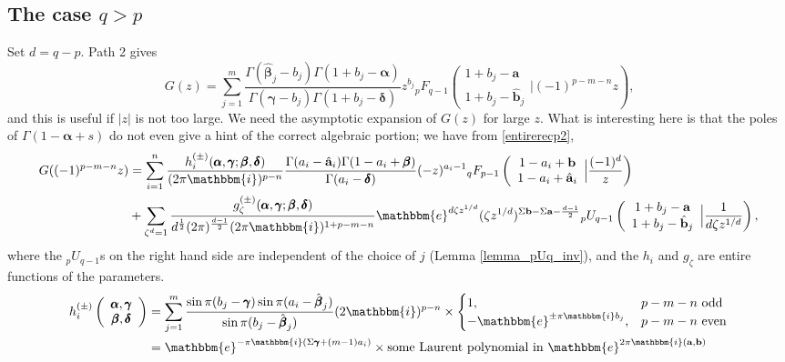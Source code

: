\documentclass[12pt]{article}
\newcommand{\ee}[0] {\mathbbm{e}}
\newcommand{\ii}[0] {\mathbbm{i}}
\numberwithin{equation}{section}
\newcommand{\FF}[6] {{}_{#1}{#2}_{#3} \left( \begin{array}{c} #4 \\ #5 \end{array} \Big| {#6}  \right)}
\newcommand{\bfa}[0] {\mathbf{a}}
\newcommand{\bfb}[0] {\mathbf{b}}
\newcommand{\bfalpha}[0] {\pmb{\alpha}}
\newcommand{\bfgamma}[0] {\pmb{\gamma}}
\newcommand{\bfbeta}[0]  {\pmb{\beta}}
\newcommand{\bfdelta}[0] {\pmb{\delta}}
\begin{document}
\subsection{The case $q>p$}
Set $d = q-p$. Path 2 gives
\begin{equation}
\label{eq_Gpath2}
G(z) = \sum_{j=1}^{m} \frac{\Gamma(\hat{\bfbeta}_j - b_j)\Gamma(1+b_j-\bfalpha)}{\Gamma(\bfgamma-b_j)\Gamma(1+b_j-\bfdelta)} z^{b_j}\FF{p}{F}{q-1}{1+b_j-\bfa}{1+b_j-\hat{\bfb}_j}{(-1)^{p-m-n}z}\text{,}
\end{equation}
and this is useful if $|z|$ is not too large. We need the asymptotic expansion of $G(z)$ for large $z$. What is interesting here is that the poles of $\Gamma(1-\bfalpha+s)$ do not even give a hint of the correct algebraic portion; we have from \eqref{entirerecp2},
\begin{align*}
G((-1)^{p-m-n}z) &= \sum_{i=1}^{n} \frac{h_{i}^{(\pm)}(\bfalpha, \bfgamma; \bfbeta, \bfdelta)}{(2\pi \ii)^{p-n} } \frac{\Gamma(a_i-\hat{\bfa}_i)\Gamma(1-a_i+\bfbeta)}{\Gamma(a_i-\bfdelta)} (-z)^{a_i-1}\FF{q}{F}{p-1}{1-a_i+\bfb}{1-a_i+\hat{\bfa}_i}{\frac{(-1)^{d}}{z}}\\
&+\sum_{\zeta^d=1} \frac{g_{\zeta}^{(\pm)}(\bfalpha, \bfgamma; \bfbeta, \bfdelta)}{d^{\frac{1}{2}} (2\pi)^{\frac{d-1}{2}} (2\pi \ii)^{1+p-m-n}} \ee^{d \zeta z^{1/d}}(\zeta z^{1/d})^{\Sigma \bfb - \Sigma \bfa - \frac{d-1}{2}} \FF{p}{U}{q-1}{1+b_j-\bfa}{1+b_j-\hat{\bfb}_j}{\frac{1}{d\zeta z^{1/d}}}\text{,}
\end{align*}
where the ${}_p U_{q-1}$s on the right hand side are independent of the choice of $j$ (Lemma \ref{lemma_pUq_inv}), and the $h_i$ and $g_{\zeta}$ are entire functions of the parameters.
\begin{align*}
h_{i}^{(\pm)}\left(\begin{array}{c} \bfalpha, \bfgamma \\ \bfbeta, \bfdelta \end{array}\right) &= \sum_{j=1}^{m} \frac{\sin \pi (b_j-\bfgamma) \sin \pi (a_i-\hat{\bfbeta}_j)}{\sin \pi (b_j-\hat{\bfbeta}_j)} (2 \ii)^{p-n} \times \begin{cases} 1\text{,}& p-m-n \text{ odd}\\
-\ee^{\pm \pi \ii b_j}\text{,}& p-m-n \text{ even}\end{cases}\\
&= \ee^{-\pi \ii (\Sigma \bfgamma + (m-1) a_i)} \times \text{some Laurent polynomial in } \ee^{2\pi \ii (\bfa, \bfb)}
\end{align*}
\end{document}
